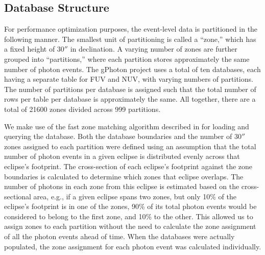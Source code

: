 \documentclass[preprint]{aastex}
\begin{document}
\subsection{Database Structure}
For performance optimization purposes, the event-level data is partitioned in the following manner.  The smallest unit of partitioning is called a ``zone,'' which has a fixed height of $30''$ in declination.  A varying number of zones are further grouped into ``partitions,'' where each partition stores approximately the same number of photon events. The gPhoton project uses a total of ten databases, each having a separate table for FUV and NUV, with varying numbers of partitions.  The number of partitions per database is assigned such that the total number of rows per table per database is approximately the same. All together, there are a total of 21600 zones divided across 999 partitions.

We make use of the fast zone matching algorithm described in \citet{gra2006} for loading and querying the database. Both the database boundaries and the number of $30''$ zones assigned to each partition were defined using an assumption that the total number of photon events in a given eclipse is distributed evenly across that eclipse's footprint. The cross-section of each eclipse's footprint against the zone boundaries is calculated to determine which zones that eclipse overlaps. The number of photons in each zone from this eclipse is estimated based on the cross-sectional area, e.g., if a given eclipse spans two zones, but only 10\% of the eclipse's footprint is in one of the zones, 90\% of its total photon events would be considered to belong to the first zone, and 10\% to the other. This allowed us to assign zones to each partition without the need to calculate the zone assignment of all the photon events ahead of time. When the databases were actually populated, the zone assignment for each photon event was calculated individually.
\end{document}

